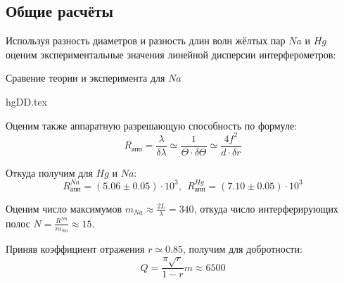 \subsection{Общие расчёты}

Используя разность диаметров и разность длин волн жёлтых пар 
$Na$ и $Hg$ оценим экспериментальные значения линейной 
дисперсии интерферометров:

\begin{table}[h]
  \caption{Сравение теории и эксперимента для $Na$}
\end{table}

{hgDD.tex}

Оценим также аппаратную разрешающую способность по формуле:
$$
R_{апп} = \frac{\lambda}{\delta \lambda} 
\simeq
\frac{1}{\Theta \cdot \delta \Theta}
\simeq
\frac{4f^2}{d\cdot\delta r}
$$

Откуда получим для $Hg$ и $Na$:
$$
R_{апп}^{Na} = 
(5.06 \pm 0.05) \cdot 10^3, \: \: 
R_{апп}^{Hg} = 
(7.10 \pm 0.05) \cdot 10^3
$$

Оценим число максимумов $m_{Na} \approx \frac{2L}{\lambda}
= 340$, откуда число интерферирующих полос $N = \frac{R^{Na}}{m_{Na}} \approx 15$.

Приняв коэффициент отражения $r \simeq 0.85$, получим для добротности:
$$
Q =   \frac{\pi\sqrt{r}}{1-r}m \approx 6500
$$